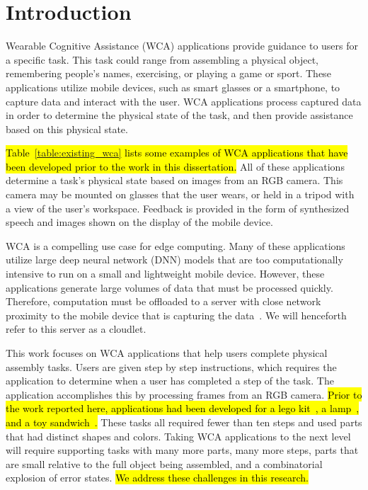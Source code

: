 \chapter{Introduction}\label{chap:intro}

Wearable Cognitive Assistance (WCA) applications provide guidance to users for
a specific task.
This task could range from assembling a physical object, remembering people's
names, exercising, or playing a game or sport.
These applications
utilize mobile devices, such as smart glasses or a smartphone, to capture data
and interact with the user.
WCA applications process captured data in order to determine the physical state
of the task, and then provide assistance based on this physical state.

\hl{
  Table~{\ref{table:existing_wca}} lists some examples of WCA applications that
  have been developed prior to the work in this dissertation.}
All of these applications determine a task's physical state based on images from
an RGB camera.
This camera may be mounted on glasses that the user wears, or held in a tripod
with a view of the user's workspace.
Feedback is provided in the form of synthesized speech and images shown on the
display of the mobile device.

WCA is a compelling use case for edge computing. Many of these applications
utilize large deep neural network (DNN) models that are too computationally
intensive to run on a small and lightweight mobile device. However, these
applications generate large volumes of data that must be processed quickly.
Therefore, computation must be offloaded to a server with close network
proximity to the mobile device that is capturing the data~\cite{satya14}. We
will henceforth refer to this server as a cloudlet.

This work focuses on WCA applications that help users complete physical
assembly tasks.
Users are given step by step instructions, which requires the application to
determine when a user has completed a step of the task.
The application accomplishes this by processing frames from an RGB camera.
\hl{
  Prior to the work reported here, applications had been
  developed for a lego kit~{\cite{lego}}, a lamp~{\cite{lamp}}, and a toy
  sandwich~{\cite{sandwich}}.
}
These tasks all required fewer than ten steps and
used parts that had distinct shapes and colors.
Taking WCA applications to the next level will require supporting tasks with
many more parts, many more steps, parts that are small relative to the full
object being assembled, and a combinatorial explosion of error states.
\hl{We address these challenges in this research.}

